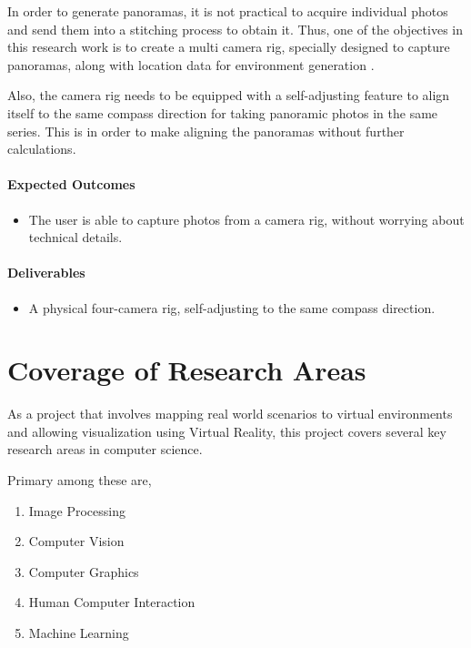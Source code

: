 In order to generate panoramas, it is not practical to acquire individual photos and send them into a stitching process to obtain it. Thus, one of the objectives in this research work is to create a multi camera rig, specially designed to capture panoramas, along with location data for environment generation \cite{18}. 

Also, the camera rig needs to be equipped with a self-adjusting feature to align itself to the same compass direction for taking panoramic photos in the same series. This is in order to make aligning the panoramas without further calculations.

\paragraph{\textbf{Expected Outcomes}}
\begin{itemize}
\item{The user is able to capture photos from a camera rig, without worrying about technical details.}
\end{itemize}

\paragraph{\textbf{Deliverables}}
\begin{itemize}
\item{A physical four-camera rig, self-adjusting to the same compass direction.}
\end{itemize}

\section{Coverage of Research Areas}
\label{intro_sec:4}

As a project that involves mapping real world scenarios to virtual environments and allowing visualization using Virtual Reality, this project covers several key research areas in computer science.

Primary among these are,
\begin{enumerate}
\item{Image Processing}
\item{Computer Vision}
\item{Computer Graphics}
\item{Human Computer Interaction}
\item{Machine Learning}
\end{enumerate}

